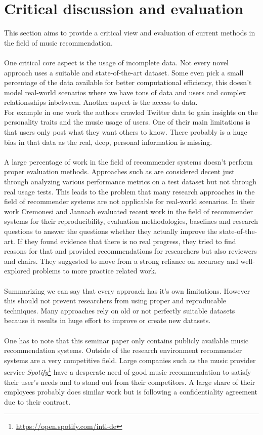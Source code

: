 \documentclass[runningheads,a4paper]{llncs}
\begin{document}
\section{Critical discussion and evaluation}
This section aims to provide a critical view and evaluation of current methods in the field of music recommendation. \\
\\
One critical core aspect is the usage of incomplete data. Not every novel approach uses a suitable and state-of-the-art dataset.
Some even pick a small percentage of the data available for better computational efficiency, this doesn't model real-world scenarios where we have tons of data and users and complex relationsships inbetween. 
Another aspect is the access to data. \\
For example in one work  \cite{melchiorre2020personality}  the authors crawled Twitter data
 to gain insights on the personality traits and the music usage of users. 
One of their main limitations is that users only post what they want others to know. There probably is a huge bias in that data as the real, deep, personal information is missing. \\
\\
A large percentage of work in the field of recommender systems doesn't perform proper evaluation methods. 
Approaches such as \cite{niyazov2021content} are considered decent just through analyzing various performance metrics on a test dataset but not 
through real usage tests. This leads to the problem that many research approaches in the field of recommender systems are 
not applicable for real-world scenarios. 
In their work Cremonesi and Jannach evaluated recent work in the field of recommender systems for their reproducibility, 
evaluation methodologies, baselines and research questions to answer the questions whether they actually improve the state-of-the-art.
If they found evidence that there is no real progress, they tried to find reasons for that and provided recommendations for researchers 
but also reviewers and chairs. 
They suggested to move from a strong reliance on accuracy and well-explored problems to more practice related work. \cite{cremonesi2021progress} \\
\\
Summarizing we can say that every approach has it's own limitations. However this should not prevent researchers from using proper and reproducable techniques. 
Many approaches rely on old or not perfectly suitable datasets because 
it results in huge effort to improve or create new datasets. \\
\\
One has to note that this seminar paper only contains publicly available music recommendation systems.
Outside of the research environment recommender systems are a very competitive field. 
Large companies such as the music provider service \textit{Spotify}\footnote{\url{https://open.spotify.com/intl-de}}
have a desperate need of good music recommendation to satisfy their user's needs and to stand out from their competitors. 
A large share of their employees probably does similar work but 
is following a confidentiality agreement due to their contract.
\end{document}
